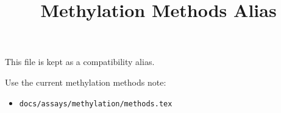 \documentclass[11pt]{article}
\title{Methylation Methods Alias}
\author{}
\date{}
\begin{document}
\maketitle

This file is kept as a compatibility alias.

Use the current methylation methods note:
\begin{itemize}
\item \texttt{docs/assays/methylation/methods.tex}
\end{itemize}
\end{document}
